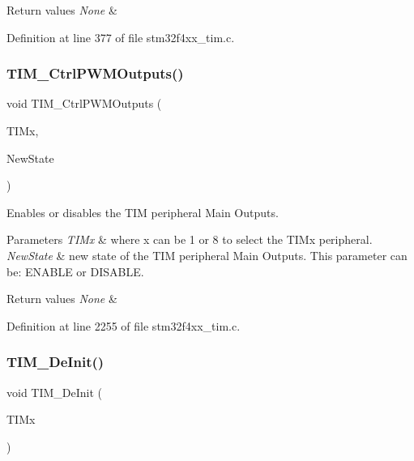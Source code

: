 \begin{DoxyRetVals}{Return values}
{\em None} & \\
\hline
\end{DoxyRetVals}


Definition at line 377 of file stm32f4xx\+\_\+tim.\+c.

\mbox{\label{group___t_i_m_ga3e59ebced2ab8e0b817c460f1670e97d}} 
\subsubsection{\texorpdfstring{T\+I\+M\+\_\+\+Ctrl\+P\+W\+M\+Outputs()}{TIM\_CtrlPWMOutputs()}}
{\footnotesize\ttfamily void T\+I\+M\+\_\+\+Ctrl\+P\+W\+M\+Outputs (\begin{DoxyParamCaption}\item[{\hyperlink{struct_t_i_m___type_def}{T\+I\+M\+\_\+\+Type\+Def} $\ast$}]{T\+I\+Mx,  }\item[{Functional\+State}]{New\+State }\end{DoxyParamCaption})}



Enables or disables the T\+IM peripheral Main Outputs. 


\begin{DoxyParams}{Parameters}
{\em T\+I\+Mx} & where x can be 1 or 8 to select the T\+I\+Mx peripheral. \\
\hline
{\em New\+State} & new state of the T\+IM peripheral Main Outputs. This parameter can be\+: E\+N\+A\+B\+LE or D\+I\+S\+A\+B\+LE. \\
\hline
\end{DoxyParams}

\begin{DoxyRetVals}{Return values}
{\em None} & \\
\hline
\end{DoxyRetVals}


Definition at line 2255 of file stm32f4xx\+\_\+tim.\+c.

\mbox{\label{group___t_i_m_ga1659cc0ce503ac151568e0c7c02b1ba5}} 
\subsubsection{\texorpdfstring{T\+I\+M\+\_\+\+De\+Init()}{TIM\_DeInit()}}
{\footnotesize\ttfamily void T\+I\+M\+\_\+\+De\+Init (\begin{DoxyParamCaption}\item[{\hyperlink{struct_t_i_m___type_def}{T\+I\+M\+\_\+\+Type\+Def} $\ast$}]{T\+I\+Mx }\end{DoxyParamCaption})}



